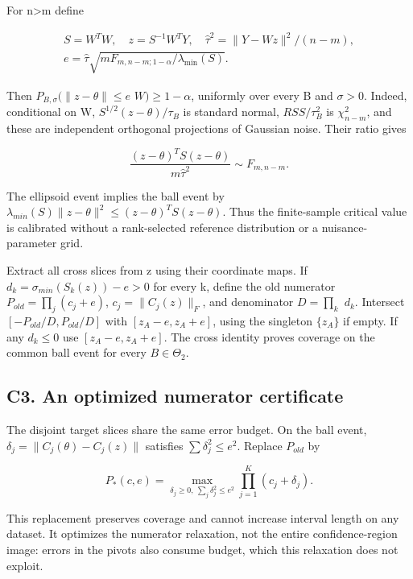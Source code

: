 \documentclass[
  11pt,
]{article}
\begin{document}
For n\textgreater m define

\[
 \begin{gathered}
 S=W^TW,\quad z=S^{-1}W^TY,\quad
 \widehat\tau^2=\|Y-Wz\|^2/(n-m),\\
 e=\widehat\tau\sqrt{mF_{m,n-m;1-\alpha}/\lambda_{\min}(S)}.
 \end{gathered}
\]

Then \(P_{B,\sigma }(\|z-\theta \|\le e\) \textbar{} \(W)\ge 1-\alpha\),
uniformly over every B and \(\sigma >0\). Indeed, conditional on W,
\(S^{1/2}(z-\theta )/\tau _B\) is standard normal, \(RSS/\tau _B^{2}\)
is \(\chi ^{2}_{n-m}\), and these are independent orthogonal projections
of Gaussian noise. Their ratio gives

\[
 \frac{(z-\theta)^TS(z-\theta)}{m\widehat\tau^2}
       \sim F_{m,n-m}.
\]

The ellipsoid event implies the ball event by
\(\lambda _{min}(S)\|z-\theta \|^{2}\le (z-\theta )^TS(z-\theta )\).
Thus the finite-sample critical value is calibrated without a
rank-selected reference distribution or a nuisance-parameter grid.

Extract all cross slices from z using their coordinate maps. If
\(d_k=\sigma _{min}(S_k(z))-e>0\) for every k, define the old numerator
\(P_{old}=\prod _j(c_j+e)\), \(c_j=\|C_j(z)\|_F\), and denominator
\(D=\prod _k\) \(d_k\). Intersect \([-P_{old}/D,P_{old}/D]\) with
\([z_A-e,z_A+e]\), using the singleton \(\{z_A\}\) if empty. If any
\(d_k\le 0\) use \([z_A-e,z_A+e]\). The cross identity proves coverage
on the common ball event for every \(B\in \Theta _2\).

\subsection{C3. An optimized numerator
certificate}\label{c3.-an-optimized-numerator-certificate}

The disjoint target slices share the same error budget. On the ball
event, \(\delta _j=\|C_j(\theta )-C_j(z)\|\) satisfies
\(\sum \delta _j^{2}\le e^{2}\). Replace \(P_{old}\) by

\[
 P_*(c,e)=\max_{\delta_j\ge0,\ \sum_j\delta_j^2\le e^2}
                   \prod_{j=1}^K(c_j+\delta_j). \tag{C1}
\]

This replacement preserves coverage and cannot increase interval length
on any dataset. It optimizes the numerator relaxation, not the entire
confidence-region image: errors in the pivots also consume budget, which
this relaxation does not exploit.
\end{document}
